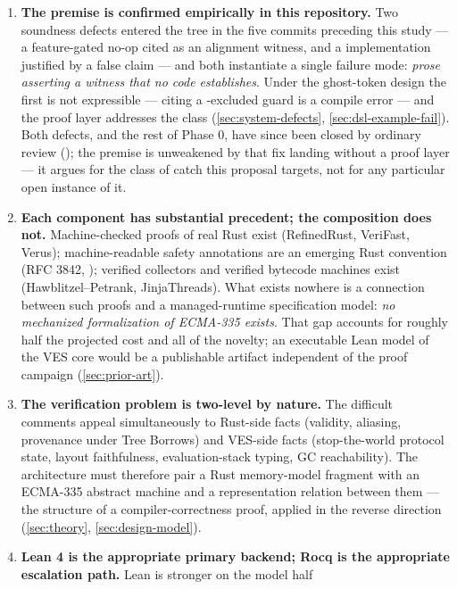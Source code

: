 \begin{enumerate}[leftmargin=1.6em]
\item \textbf{The premise is confirmed empirically in this
  repository.} Two soundness defects entered the tree in the five
  commits preceding this study --- a feature-gated no-op cited as an
  alignment witness, and a  implementation justified by a
  false claim --- and both instantiate a single failure mode:
  \emph{prose asserting a witness that no code establishes}. Under
  the ghost-token design the first is not expressible --- citing a
  -excluded guard is a compile error --- and the proof layer
  addresses the class (\cref{sec:system-defects},
  \cref{sec:dsl-example-fail}). Both defects, and the rest of Phase 0,
  have since been closed by ordinary review (); the
  premise is unweakened by that fix landing without a proof layer ---
  it argues for the class of catch this proposal targets, not for any
  particular open instance of it.
\item \textbf{Each component has substantial precedent; the
  composition does not.} Machine-checked proofs of real 
  Rust exist (RefinedRust, VeriFast, Verus); machine-readable safety
  annotations are an emerging Rust convention (RFC 3842,
  ); verified collectors and verified bytecode machines
  exist (Hawblitzel--Petrank, JinjaThreads). What exists nowhere is a
  connection between such proofs and a managed-runtime specification
  model: \emph{no mechanized formalization of ECMA-335 exists}. That
  gap accounts for roughly half the projected cost and all of the
  novelty; an executable Lean model of the VES core would be a
  publishable artifact independent of the proof campaign
  (\cref{sec:prior-art}).
\item \textbf{The verification problem is two-level by nature.} The
  difficult \safetyc{} comments appeal simultaneously to Rust-side
  facts (validity, aliasing, provenance under Tree Borrows) and
  VES-side facts (stop-the-world protocol state, layout faithfulness,
  evaluation-stack typing, GC reachability). The architecture must
  therefore pair a Rust memory-model fragment with an ECMA-335
  abstract machine and a representation relation between them --- the
  structure of a compiler-correctness proof, applied in the reverse
  direction (\cref{sec:theory}, \cref{sec:design-model}).
\item \textbf{Lean 4 is the appropriate primary backend; Rocq is the
  appropriate escalation path.} Lean is stronger on the model half

\end{enumerate}
